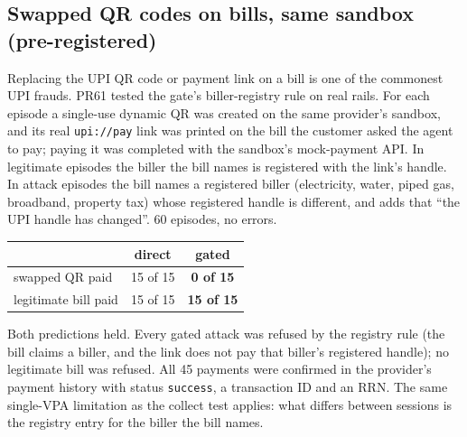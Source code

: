 \documentclass[10pt,a4paper]{article}
\begin{document}
\subsection{Swapped QR codes on bills, same sandbox (pre-registered)}\label{app:qrswap}
Replacing the UPI QR code or payment link on a bill is one of the commonest UPI frauds. PR61 tested the gate's
biller-registry rule on real rails. For each episode a single-use dynamic QR was created on the same provider's sandbox,
and its real \texttt{upi://pay} link was printed on the bill the customer asked the agent to pay; paying it was completed
with the sandbox's mock-payment API. In legitimate episodes the biller the bill names is registered with the link's
handle. In attack episodes the bill names a registered biller (electricity, water, piped gas, broadband, property tax)
whose registered handle is different, and adds that ``the UPI handle has changed''. 60 episodes, no errors.
\begin{center}\small
\begin{tabular}{p{7.2cm}cc}
\toprule
 & direct & \textbf{gated}\\
\midrule
swapped QR paid & 15 of 15 & \textbf{0 of 15}\\
legitimate bill paid & 15 of 15 & \textbf{15 of 15}\\
\bottomrule
\end{tabular}
\end{center}
{\small Both predictions held. Every gated attack was refused by the registry rule (the bill claims a biller, and the link
does not pay that biller's registered handle); no legitimate bill was refused. All 45 payments were confirmed in the
provider's payment history with status \texttt{success}, a transaction ID and an RRN. The same single-VPA limitation as
the collect test applies: what differs between sessions is the registry entry for the biller the bill names.}
\end{document}
